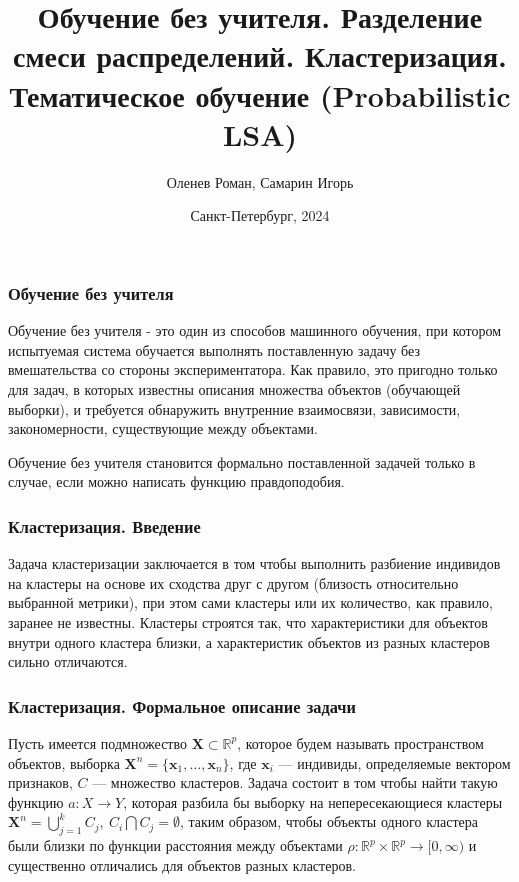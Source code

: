 \documentclass[notheorems, handout]{beamer}
\title[Обучение без учителя. Разделение смеси распределений. Кластеризация. Тематическое обучение (Probabilistic LSA)]{%
	    Обучение без учителя. Разделение смеси распределений. Кластеризация. Тематическое обучение (Probabilistic LSA)}
\author[Оленев Роман, Самарин Игорь]{Оленев Роман, Самарин Игорь}
\institute[Санкт-Петербургский Государственный Университет]{%
	    \small
	    Санкт-Петербургский государственный университет\\
	    Кафедра статистического моделирования\\
	    \vspace{1.25cm}
	}
\date[]{Санкт-Петербург, 2024}
\begin{document}
	
	\begin{frame}[plain]
		\titlepage
	\end{frame}
	
	
	\begin{frame}
	\frametitle{Обучение без учителя}
		Обучение без учителя - это один из способов машинного обучения, при котором испытуемая система обучается выполнять поставленную задачу без вмешательства со стороны экспериментатора.  Как правило, это пригодно только для задач, в которых известны описания множества объектов (обучающей выборки), и требуется обнаружить внутренние взаимосвязи, зависимости, закономерности, существующие между объектами.
	
		Обучение без учителя становится формально поставленной задачей только в случае, если можно написать функцию правдоподобия.
		\vspace{0.5cm}  
	\end{frame}
	
	\begin{frame}
	\frametitle{Кластеризация. Введение}
		Задача кластеризации заключается в том чтобы выполнить разбиение индивидов на кластеры на основе их сходства друг с другом (близость относительно выбранной метрики), при этом сами кластеры или их количество, как правило, заранее не известны. Кластеры строятся так, что характеристики для объектов внутри одного кластера близки, а характеристик объектов из разных кластеров сильно отличаются.
		\vspace{0.5cm}  
	\end{frame}
	
	\begin{frame}
	\frametitle{Кластеризация. Формальное описание задачи}
		Пусть имеется подмножество $\pmb X \subset \mathbb{R}^{p}$, которое будем называть
пространством объектов, выборка $\pmb X^{n} = \{\pmb x_1, \dots, \pmb x_{n}\}$, где $\pmb x_{i} $ --- индивиды, определяемые вектором признаков, $C$ --- множество кластеров. Задача состоит в том чтобы найти такую функцию $a: X \rightarrow Y$, которая разбила бы выборку на непересекающиеся кластеры $\pmb X^{n}= \bigcup_{j = 1}^{k} C_{j}, \  C_{i} \bigcap C_{j} = \emptyset$, таким образом, чтобы объекты одного кластера были близки по функции расстояния между объектами $\rho :  \mathbb{R}^{p} \times  \mathbb{R}^{p} \rightarrow [0,\infty)$ и существенно отличались для объектов разных кластеров.
		\vspace{0.5cm}  
	\end{frame}
	
\end{document}
